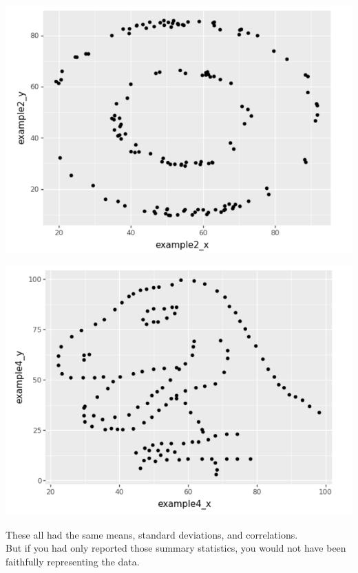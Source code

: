 \documentclass[11pt]{beamer}
\begin{document}
\begin{frame}[c]{}
  \includegraphics[width=\textwidth]{datasaurus_plot_2.png}
\end{frame}

\begin{frame}[c]{}
  \includegraphics[width=\textwidth]{datasaurus_plot_3.png}
\end{frame}


\begin{frame}[c]{}
These all had the same means, standard deviations, and correlations. \\ 
\vspace{0.5cm}
\pause But if you had only reported those summary statistics, you would \alert{not have been faithfully representing the data}.
\end{frame}
\end{document}
